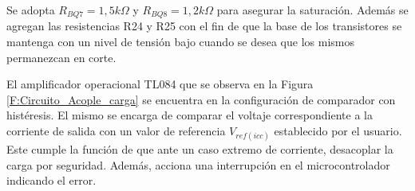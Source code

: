 Se adopta $R_{BQ7}=1,5 k\Omega$ y $R_{BQ8}=1,2 k\Omega$ para asegurar la saturación. Además se agregan las resistencias R24 y R25 con el fin de que la base de los transistores se mantenga con un nivel de tensión bajo cuando se desea que los mismos permanezcan en corte.\par 
El amplificador operacional TL084 \cite{TL084} que se observa en la Figura \ref{F:Circuito_Acople_carga} se encuentra en la configuración de comparador con histéresis. El mismo se encarga de comparar el voltaje correspondiente a la corriente de salida con un valor de referencia $V_{ref(icc)}$ establecido por el usuario. Este cumple la función de que ante un caso extremo de corriente, desacoplar la carga por seguridad. Además, acciona una interrupción en el microcontrolador indicando el error.\par 


















